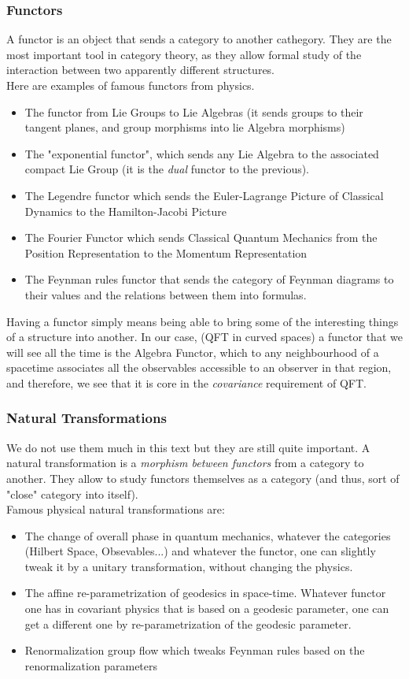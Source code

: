 \documentclass[a4paper,11pt]{article}
\numberwithin{equation}{section}
\theoremstyle{definition}
\begin{document}
    \subsubsection{Functors}
    A functor is an object that sends a category to another cathegory. They are the most important tool in category theory, as they allow formal study of the interaction between two apparently different structures.\\
    Here are examples of famous functors from physics.
    \begin{itemize}
        \item The functor from Lie Groups to Lie Algebras (it sends groups to their tangent planes, and group morphisms into lie Algebra morphisms)
        \item  The "exponential functor", which sends any Lie Algebra to the associated compact Lie Group (it is the \emph{dual} functor to the previous).
        \item The Legendre functor which sends the Euler-Lagrange Picture of Classical Dynamics to the Hamilton-Jacobi Picture
        \item The Fourier Functor which sends Classical Quantum Mechanics from the Position Representation to the Momentum Representation
        \item The Feynman rules functor that sends the category of Feynman diagrams to their values and the relations between them into formulas.
    \end{itemize}
    Having a functor simply means being able to bring some of the interesting things of a structure into another. In our case, (QFT in curved spaces) a functor that we will see all the time is the Algebra Functor, which to any neighbourhood of a spacetime associates all the observables accessible to an observer in that region, and therefore, we see that it is core in the \emph{covariance} requirement of QFT.

    \subsubsection{Natural Transformations}
    We do not use them much in this \color{red} text \color{black} but they are still quite important. A natural transformation is a \emph{morphism between functors} from a category to another. They allow to study functors themselves as a category (and thus, sort of "close" category into itself).\\
    Famous physical natural transformations are:
    \begin{itemize}
        \item The change of overall phase in quantum mechanics, whatever the categories (Hilbert Space, Obsevables...) and whatever the functor, one can slightly tweak it by a unitary transformation, without changing the physics.
        \item The affine re-parametrization of geodesics in space-time. Whatever functor one has in covariant physics that is based on a geodesic parameter, one can get a different one by re-parametrization of the geodesic parameter.
        \item Renormalization group flow which tweaks Feynman rules based on the renormalization parameters
    \end{itemize}
\end{document}
